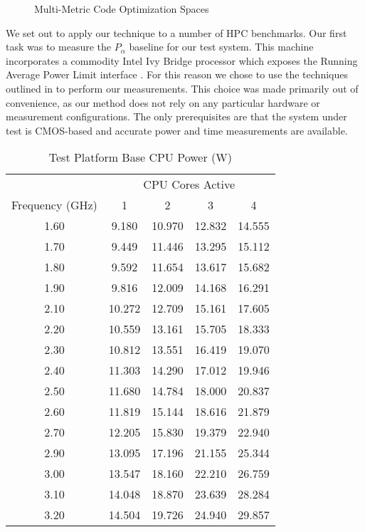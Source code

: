 \begin{figure}

\caption{Multi-Metric Code Optimization Spaces}\label{fig:multimetric}
\end{figure}


We set out to apply our technique to a number of HPC benchmarks. Our first task was to measure the $P_\alpha$ baseline for our test system. This machine incorporates a commodity Intel Ivy Bridge processor which exposes the Running Average Power Limit interface \cite{david:2010aa}. For this reason we chose to use the techniques outlined in \cite{hackenberg:2013aa} to perform our measurements. This choice was made primarily out of convenience, as our method does not rely on any particular hardware or measurement configurations. The only prerequisites are that the system under test is CMOS-based and accurate power and time measurements are available.

\begin{table}
\centering
\small
\begin{tabular}{@{}ccccc@{}} \toprule
&\multicolumn{4}{c}{CPU Cores Active} \\ \cmidrule(r){2-5}
Frequency (GHz) & 1 & 2 & 3 & 4 \\ \midrule 
1.60 & 9.180 & 10.970 & 12.832 & 14.555 \\ 
1.70 & 9.449 & 11.446 & 13.295 & 15.112 \\ 
1.80 & 9.592 & 11.654 & 13.617 & 15.682 \\ 
1.90 & 9.816 & 12.009 & 14.168 & 16.291 \\ 
2.10 & 10.272 & 12.709 & 15.161 & 17.605 \\ 
2.20 & 10.559 & 13.161 & 15.705 & 18.333 \\ 
2.30 & 10.812 & 13.551 & 16.419 & 19.070 \\ 
2.40 & 11.303 & 14.290 & 17.012 & 19.946 \\ 
2.50 & 11.680 & 14.784 & 18.000 & 20.837 \\ 
2.60 & 11.819 & 15.144 & 18.616 & 21.879 \\ 
2.70 & 12.205 & 15.830 & 19.379 & 22.940 \\ 
2.90 & 13.095 & 17.196 & 21.155 & 25.344 \\ 
3.00 & 13.547 & 18.160 & 22.210 & 26.759 \\ 
3.10 & 14.048 & 18.870 & 23.639 & 28.284 \\ 
3.20 & 14.504 & 19.726 & 24.940 & 29.857 \\ 
\bottomrule
\end{tabular}
   \vspace{0.5\baselineskip}
\caption{Test Platform Base CPU Power (W)}
\label{tab:baseline}
\end{table} 

